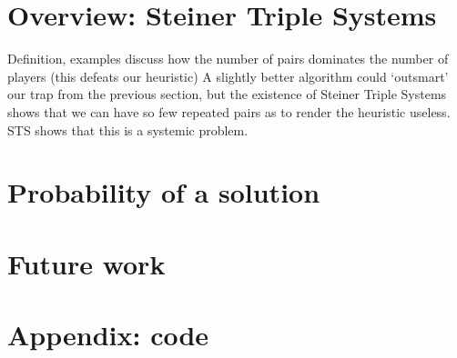 \documentclass[12pt]{article}
\begin{document}
\section{Overview: Steiner Triple Systems}
    Definition, examples
    discuss how the number of pairs dominates the number of players
    (this defeats our heuristic)
    A slightly better algorithm could `outsmart' our trap from the previous section, but the existence of Steiner Triple Systems shows that we can have so few repeated pairs as to render the heuristic useless. STS shows that this is a systemic problem. 



\section{Probability of a solution}

\section{Future work}

\section{Appendix: code}
\end{document}
